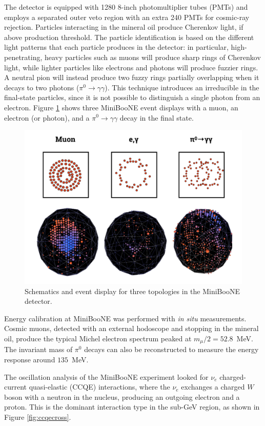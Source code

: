 The detector is equipped with 1280 8-inch photomultiplier tubes (PMTs) and employs a separated outer veto region with an extra 240 PMTs for cosmic-ray rejection. Particles interacting in the mineral oil produce Cherenkov light, if above production threshold. The particle identification is based on the different light patterns that each particle produces in the detector: in particular, high-penetrating, heavy particles such as muons will produce sharp rings of Cherenkov light, while lighter particles like electrons and photons will produce fuzzier rings. A neutral pion will instead produce two fuzzy rings partially overlapping when it decays to two photons ($\pi^{0}\rightarrow \gamma\gamma$). 
This technique introduces an irreducible  in the final-state particles, since it is not possible to distinguish a single photon from an electron. Figure \ref{fig:miniboone_evd} shows three MiniBooNE event displays with a muon, an electron (or photon), and a $\pi^0\rightarrow\gamma\gamma$ decay in the final state.

\begin{figure}[htbp]
    \centering
    \includegraphics[width=0.85\linewidth]{figures/miniboone_evd.png}
    \caption{Schematics and event display for three topologies in the MiniBooNE detector.}
    \label{fig:miniboone_evd}
\end{figure}

Energy calibration at MiniBooNE was performed with \emph{in situ} measurements. Cosmic muons, detected with an external hodoscope and stopping in the mineral oil, produce the typical Michel electron spectrum peaked at $m_{\mu}/2 = 52.8$~MeV. The invariant mass of $\pi^0$ decays can also be reconstructed to measure the energy response around $135$~MeV. 

The oscillation analysis of the MiniBooNE experiment looked for $\nu_e$ charged-current quasi-elastic (CCQE) interactions, where the $\nu_{e}$ exchanges a charged $W$ boson with a neutron in the nucleus, producing an outgoing electron and a proton. This is the dominant interaction type in the sub-GeV region, as shown in Figure \ref{fig:ccqecross}.

